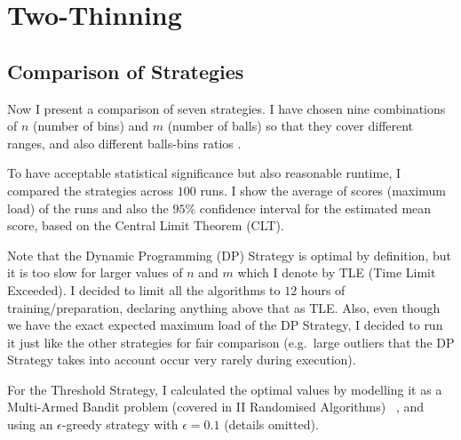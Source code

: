 


\section{Two-Thinning}


\subsection{Comparison of Strategies}

Now I present a comparison of seven \TwoThinning strategies. I have chosen nine combinations of $n$ (number of bins) and $m$ (number of balls) so that they cover different ranges, and also different balls-bins ratios .


To have acceptable statistical significance but also reasonable runtime, I compared the strategies across $100$ runs. I show the average of scores (maximum load) of the runs and also the $95\%$ confidence interval for the estimated mean score, based on the Central Limit Theorem (CLT). 


Note that the Dynamic Programming (DP) Strategy is optimal by definition, but it is too slow for larger values of $n$ and $m$ which I denote by TLE (Time Limit Exceeded). I decided to limit all the algorithms to $12$ hours of training/preparation, declaring anything above that as TLE. Also, even though we have the exact expected maximum load of the DP Strategy, I decided to run it just like the other strategies for fair comparison (e.g.\ large outliers that the DP Strategy takes into account occur very rarely during execution).


For the Threshold Strategy, I calculated the optimal values by modelling it as a Multi-Armed Bandit problem (covered in II Randomised Algorithms) ~\cite{katehakis1987multiarmedbandit}, and using an $\epsilon$-greedy strategy with $\epsilon=0.1$ (details omitted).


